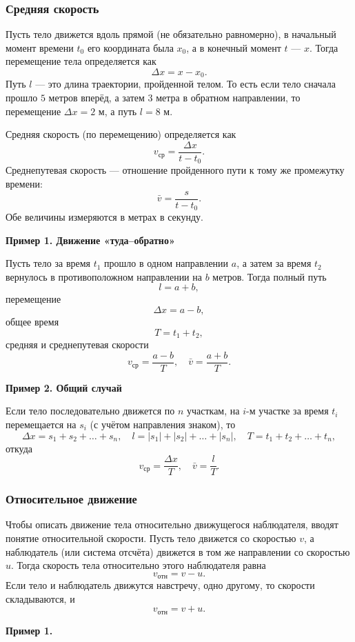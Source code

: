 \documentclass[12 pt, a4paper]{article}%
\begin{document}
\subsubsection*{Средняя скорость}
Пусть тело движется вдоль прямой (не обязательно равномерно), в начальный момент времени \(t_0\) его координата была \(x_0\), а в конечный момент \(t\) — \(x\). Тогда перемещение тела определяется как
\[
\Delta x = x - x_0.
\]
Путь \(l\) — это длина траектории, пройденной телом. То есть если тело сначала прошло $5$ метров вперёд, а затем $3$ метра в обратном направлении, то перемещение $\Delta x = 2$ м, а путь $l = 8$ м.

Средняя скорость (по перемещению) определяется как
\[
v_{\mathrm{ср}} = \frac{\Delta x}{t - t_0}.
\]
Среднепутевая скорость — отношение пройденного пути к тому же промежутку времени:
\[
\bar v = \frac{s}{t - t_0}.
\]
Обе величины измеряются в метрах в секунду.


\textbf{Пример 1. Движение «туда–обратно»}

Пусть тело за время \(t_1\) прошло в одном направлении \(a\), а затем за время \(t_2\) вернулось в противоположном направлении на \(b\) метров. Тогда полный путь 
\[
l = a + b,
\]
перемещение 
\[
\Delta x = a - b,
\]
общее время 
\[
T = t_1 + t_2,
\]
средняя и среднепутевая скорости
\[
v_{\mathrm{ср}} = \frac{a - b}{T}, 
\quad
\bar v = \frac{a + b}{T}.
\]

\textbf{Пример 2. Общий случай}

Если тело последовательно движется по \(n\) участкам, на \(i\)-м участке за время \(t_i\) перемещается на \(s_i\) (с учётом направления знаком), то
\[
\Delta x = s_1 + s_2 + \dots + s_n,
\quad
l = |s_1| + |s_2| + \dots + |s_n|,
\quad
T = t_1 + t_2 + \dots + t_n,
\]
откуда
\[
v_{\mathrm{ср}} = \frac{\Delta x}{T},
\quad
\bar v = \frac{l}{T}.
\]

\subsubsection*{Относительное движение}
Чтобы описать движение тела относительно движущегося наблюдателя, вводят понятие относительной скорости. Пусть тело движется со скоростью $v$, а наблюдатель (или система отсчёта) движется в том же направлении со скоростью $u$. Тогда скорость тела относительно этого наблюдателя равна  
\[
v_{\mathrm{отн}} = v - u.
\]
Если тело и наблюдатель движутся навстречу, одно другому, то скорости складываются, и  
\[
v_{\mathrm{отн}} = v + u.
\]

\textbf{Пример 1.}
\end{document}
